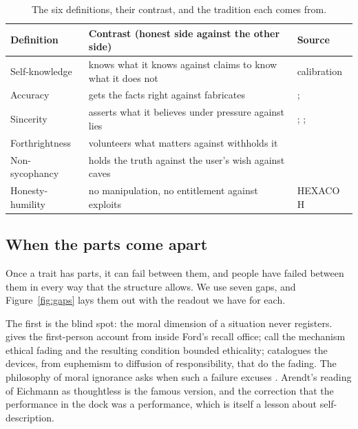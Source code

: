 \documentclass[11pt]{article}
\begin{document}
\begin{table}[tbp]
\caption{The six definitions, their contrast, and the tradition each comes from.}
\label{tab:defs}
\small
\begin{tabularx}{\textwidth}{@{}lLL@{}}
\toprule
Definition & Contrast (honest side against the other side) & Source \\
\midrule
Self-knowledge & knows what it knows against claims to know what it does not & calibration \citep{kadavath2022,li2024honesty} \\
Accuracy & gets the facts right against fabricates & \citet{williams2002}; \citet{evans2021truthful} \\
Sincerity & asserts what it believes under pressure against lies & \citet{williams2002}; \citet{bok1978}; \citet{ren2025mask} \\
Forthrightness & volunteers what matters against withholds it & \citet{anthropic_constitution} \\
Non-sycophancy & holds the truth against the user's wish against caves & \citet{sharma2023} \\
Honesty-humility & no manipulation, no entitlement against exploits & HEXACO H \citep{ashton2007} \\
\bottomrule
\end{tabularx}
\end{table}

\subsection{When the parts come apart}

Once a trait has parts, it can fail between them, and people have failed between them in every way that the
structure allows. We use seven gaps, and Figure~\ref{fig:gaps} lays them out with the readout we have for each.

The first is the blind spot: the moral dimension of a situation never registers. \citet{gioia1992} gives the
first-person account from inside Ford's recall office; \citet{tenbrunsel2004} call the mechanism ethical fading and
\citet{bazerman2011} the resulting condition bounded ethicality; \citet{bandura1999} catalogues the devices, from
euphemism to diffusion of responsibility, that do the fading. The philosophy of moral ignorance asks when such a
failure excuses \citep{rosen2003,moodyadams1994,calhoun1989,wolf1987,zimmerman1997,fitzpatrick2008,harmanE2011}.
Arendt's reading of Eichmann as thoughtless \citeyearpar{arendt1963,arendt1971} is the famous version, and
\citet{stangneth2014} the correction that the performance in the dock was a performance, which is itself a lesson
about self-description.
\end{document}
